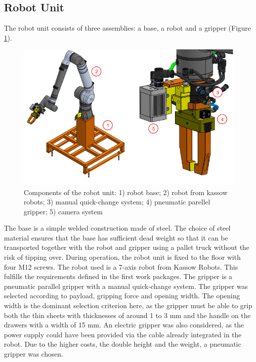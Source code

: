 
\subsection{Robot Unit}

The robot unit consists of three assemblies: a base, a robot and a gripper (Figure \ref{fig:kr1410}).

\begin{figure}[h]
    \centering
    \includegraphics[width=\textwidth]{3. System Design/3.2 Hardware Selection/kr1410.png}
    \caption{Components of the robot unit: 1) robot base; 2) robot from kassow robots; 3) manual quick-change system; 4) pneumatic parellel gripper; 5) camera system}
    \label{fig:kr1410}
\end{figure}

The base is a simple welded construction made of steel. The choice of steel material ensures that the base has
sufficient dead weight so that it can be transported together with the robot and gripper using a pallet
truck without the risk of tipping over. During operation, the robot unit is fixed to the floor with four M12
screws. The robot used is a 7-axis robot from Kassow Robots. This fulfills the requirements defined in
the first work packages. The gripper is a pneumatic parallel gripper with a manual quick-change
system. The gripper was selected according to payload, gripping force and opening width. The
opening width is the dominant selection criterion here, as the gripper must be able to grip both the thin
sheets with thicknesses of around 1 to 3 mm and the handle on the drawers with a width of 15 mm. An
electric gripper was also considered, as the power supply could have been provided via the cable
already integrated in the robot. Due to the higher costs, the double height and the weight, a pneumatic
gripper was chosen.



